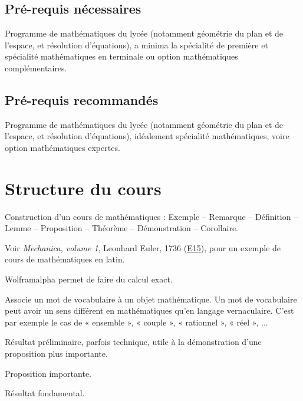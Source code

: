 \subsection*{Pré-requis nécessaires}

Programme de mathématiques du lycée (notamment géométrie du plan et de l'espace, et résolution d'équations), a minima la spécialité de première et spécialité mathématiques en terminale ou option mathématiques complémentaires.

\subsection*{Pré-requis recommandés}

Programme de mathématiques du lycée (notamment géométrie du plan et de l'espace, et résolution d'équations), idéalement spécialité mathématiques, voire option mathématiques expertes.

\section*{Structure du cours}

Construction d'un cours de mathématiques : Exemple -- Remarque -- Définition -- Lemme -- Proposition -- Théorème -- Démonstration -- Corollaire.

Voir \emph{Mechanica, volume 1}, Leonhard Euler, 1736 (\href{https://scholarlycommons.pacific.edu/euler-works/15/}{E15}), pour un exemple de cours de mathématiques en latin.

Wolframalpha permet de faire du calcul exact.

\begin{definition*}
Associe un mot de vocabulaire à un objet mathématique.
Un mot de vocabulaire peut avoir un sens différent en mathématiques qu'en langage vernaculaire.
C'est par exemple le cas de « ensemble », « couple », « rationnel », « réel », ...
\end{definition*}

\begin{lemme*}
	Résultat préliminaire, parfois technique, utile à la démonstration d'une proposition plus importante.
\end{lemme*}

\begin{proposition*}
	Proposition importante.
\end{proposition*}

\begin{theorem*}
	Résultat fondamental.
\end{theorem*}

